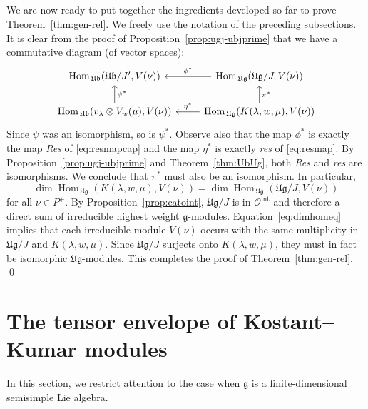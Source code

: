 \documentclass[12pt,reqno]{amsart}
\theoremstyle{plain}
\theoremstyle{definition}
\theoremstyle{remark}
\theoremstyle{plain}
\newcommand{\catoint}{\mathcal{O}^{\mathrm{int}}}
\DeclareMathOperator{\Hom}{Hom}
\begin{document}
\subsection{}\label{sec:proofends}
We are now ready to put together the ingredients developed so far to prove Theorem~\ref{thm:gen-rel}. We freely use the notation of the preceding subsections. It is clear from the proof of Proposition~\ref{prop:ugj-ubjprime} that we have a commutative diagram (of vector spaces): 
 $$ \begin{tikzcd}
\Hom_{\,\mathfrak{Ub}}(\mathfrak{Ub}/J', V(\nu)) \arrow[r, leftarrow, "\phi^*"] \arrow[d, leftarrow, "\psi^*" ]
& \Hom_{\,\mathfrak{Ug}}(\mathfrak{Ug}/J, V(\nu)) \arrow[d, leftarrow, "\pi^*"] \\
\Hom_{\,\mathfrak{Ub}}(v_\lambda \otimes V_w(\mu), V(\nu)) \arrow[r, leftarrow, "\eta^*"]
&  \Hom_{\,\mathfrak{Ug}}(K(\lambda,w,\mu), V(\nu))
\end{tikzcd}
$$ 
Since $\psi$ was an isomorphism, so is $\psi^*$. Observe also that the map $\phi^*$ is exactly the map {\em Res} of \eqref{eq:resmapcap} and the map $\eta^*$ is exactly {\em res} of \eqref{eq:resmap}. By Proposition~\ref{prop:ugj-ubjprime} and Theorem~\ref{thm:UbUg}, both {\em Res} and {\em res} are isomorphisms. We conclude that $\pi^*$ must also be an isomorphism. In particular,
\begin{equation}\label{eq:dimhomeq}
\dim \Hom_{\,\mathfrak{Ug}}(K(\lambda,w,\mu), V(\nu)) = \dim \Hom_{\,\mathfrak{Ug}}(\mathfrak{Ug}/J, V(\nu))
\end{equation}
for all $\nu \in P^+$. By Proposition~\ref{prop:catoint}, $\mathfrak{Ug}/J$ is in $\catoint$ and therefore a direct sum of irreducible highest weight $\mathfrak{g}$-modules. Equation~\eqref{eq:dimhomeq} implies that each irreducible module $V(\nu)$ occurs with the same multiplicity in $\mathfrak{Ug}/J$ and $K(\lambda,w,\mu)$. Since $\mathfrak{Ug}/J$ surjects onto $K(\lambda,w,\mu)$, they must in fact be isomorphic $\mathfrak{Ug}$-modules. This completes the proof of Theorem~\ref{thm:gen-rel}. \qed

\section{The tensor envelope of Kostant--Kumar modules}\label{sec:tensenvelope}
In this section, we restrict attention to the case when $\mathfrak{g}$ is a finite-dimensional semisimple Lie algebra.
\end{document}
